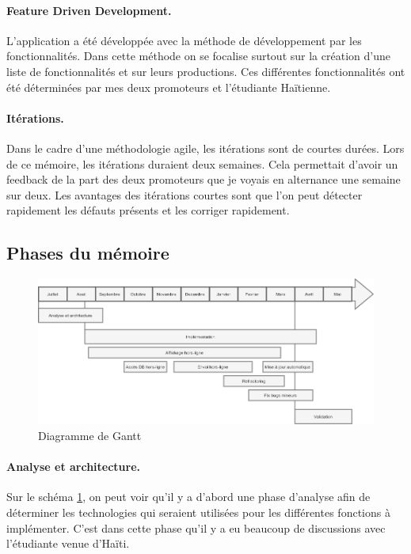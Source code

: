\documentclass{EPL-master-thesis-covers-FR}
\begin{document}
				\paragraph*{Feature Driven Development.} L'application a été développée avec la méthode de développement par les fonctionnalités. Dans cette méthode on se focalise surtout sur la création d'une liste de fonctionnalités et sur leurs productions. Ces différentes fonctionnalités ont été déterminées par mes deux promoteurs et l'étudiante Haïtienne.
				
				\paragraph*{Itérations.} Dans le cadre d'une méthodologie agile, les itérations sont de courtes durées. Lors de ce mémoire, les itérations duraient deux semaines. Cela permettait d'avoir un feedback de la part des deux promoteurs que je voyais en alternance une semaine sur deux. Les avantages des itérations courtes sont que l'on peut détecter rapidement les défauts présents et les corriger rapidement. 


			\subsection*{Phases du mémoire}
		
			
			\begin{figure}[H]
					\centering
					\includegraphics[width=1\textwidth]{images/Gantt}
					\caption{Diagramme de Gantt}
					\label{fig:Gantt}
				\end{figure}
				
			\paragraph*{Analyse et architecture.}
			Sur le schéma \ref{fig:Gantt}, on peut voir qu'il y a d'abord une phase d'analyse afin de déterminer les technologies qui seraient utilisées pour les différentes fonctions à implémenter. C'est dans cette phase qu'il y a eu beaucoup de discussions avec l'étudiante venue d'Haïti.
		
\end{document}
